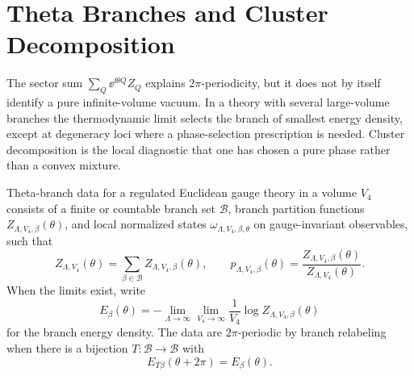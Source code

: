 \section{Theta Branches and Cluster Decomposition}
\label{sec:theta-branches-cluster-decomposition}

The sector sum
\(\sum_Q\ee^{\ii\theta Q}Z_Q\) explains \(2\pi\)-periodicity, but it does not
by itself identify a pure infinite-volume vacuum.  In a theory with several
large-volume branches the thermodynamic limit selects the branch of smallest
energy density, except at degeneracy loci where a phase-selection prescription
is needed.  Cluster decomposition is the local diagnostic that one has chosen
a pure phase rather than a convex mixture.

\begin{definition}
\label{def:theta-branch-data}
Theta-branch data for a regulated Euclidean gauge theory in a volume \(V_4\)
consists of a finite or countable branch set \(\mathcal B\), branch partition
functions \(Z_{\Lambda,V_4,\beta}(\theta)\), and local normalized states
\(\omega_{\Lambda,V_4,\beta,\theta}\) on gauge-invariant observables, such
that
\begin{equation}
  Z_{\Lambda,V_4}(\theta)
  =
  \sum_{\beta\in\mathcal B}Z_{\Lambda,V_4,\beta}(\theta),
  \qquad
  p_{\Lambda,V_4,\beta}(\theta)
  =
  \frac{Z_{\Lambda,V_4,\beta}(\theta)}
       {Z_{\Lambda,V_4}(\theta)} .
  \label{eq:theta-branch-partition-decomposition}
\end{equation}
When the limits exist, write
\begin{equation}
  E_\beta(\theta)
  =
  -\lim_{\Lambda\to\infty}\lim_{V_4\to\infty}
  \frac1{V_4}\log Z_{\Lambda,V_4,\beta}(\theta)
  \label{eq:theta-branch-energy-density}
\end{equation}
for the branch energy density.  The data are \(2\pi\)-periodic by branch
relabeling when there is a bijection \(T:\mathcal B\to\mathcal B\) with
\begin{equation}
  E_{T\beta}(\theta+2\pi)=E_\beta(\theta).
  \label{eq:theta-branch-periodic-relabeling}
\end{equation}
\end{definition}

